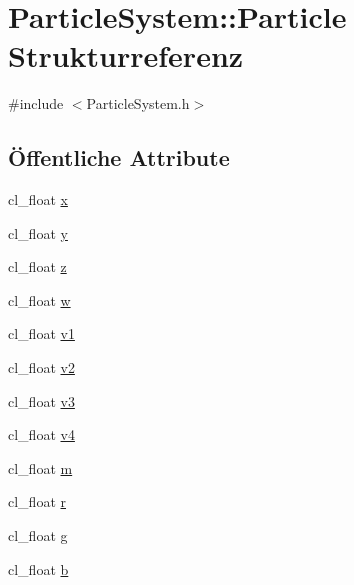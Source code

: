 \hypertarget{structParticleSystem_1_1Particle}{\section{Particle\-System\-:\-:Particle Strukturreferenz}
\label{structParticleSystem_1_1Particle}
}


{\ttfamily \#include $<$Particle\-System.\-h$>$}

\subsection*{Öffentliche Attribute}
\begin{DoxyCompactItemize}
\item 
cl\-\_\-float \hyperlink{structParticleSystem_1_1Particle_afbcacc71d3d67d836801ca572906cba2}{x}
\item 
cl\-\_\-float \hyperlink{structParticleSystem_1_1Particle_ac34361f7e23b372bdfb7fad5ae8049c3}{y}
\item 
cl\-\_\-float \hyperlink{structParticleSystem_1_1Particle_a2e9fdcdb5010bf8c25c713444c49d6aa}{z}
\item 
cl\-\_\-float \hyperlink{structParticleSystem_1_1Particle_a1ad443743569b3fe0419a68bc414b1da}{w}
\item 
cl\-\_\-float \hyperlink{structParticleSystem_1_1Particle_af42f91c94f6dc6f9712d44e4ddfbbcd6}{v1}
\item 
cl\-\_\-float \hyperlink{structParticleSystem_1_1Particle_ae224141da533bb0fc6651174a0847254}{v2}
\item 
cl\-\_\-float \hyperlink{structParticleSystem_1_1Particle_adcd4e75569b0d8eb614cc8d393ef7e7d}{v3}
\item 
cl\-\_\-float \hyperlink{structParticleSystem_1_1Particle_a869ca2653700c9abed6982257d510b79}{v4}
\item 
cl\-\_\-float \hyperlink{structParticleSystem_1_1Particle_aec139286a2e70167504ac55dae4fdabe}{m}
\item 
cl\-\_\-float \hyperlink{structParticleSystem_1_1Particle_af7eeeaeadb028ec9bf674555b32a05c6}{r}
\item 
cl\-\_\-float \hyperlink{structParticleSystem_1_1Particle_a4106a1dd76569af880e0ceddba6b4079}{g}
\item 
cl\-\_\-float \hyperlink{structParticleSystem_1_1Particle_a8c154d57bf01ee548a4463a6d8305ea0}{b}
\end{DoxyCompactItemize}


